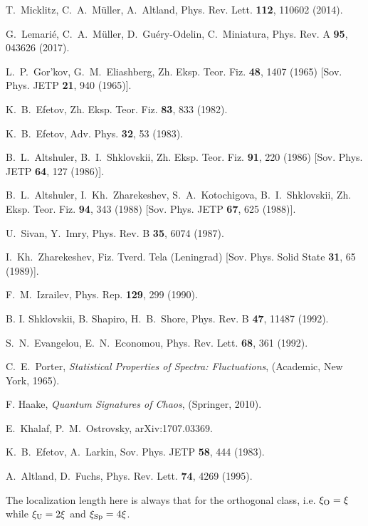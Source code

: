 \documentclass[twocolumn,showpacs,aps,prl]{revtex4}
\begin{document}
\begin{thebibliography}{99}
T.~Micklitz, C.~A.~M\"uller, A.~Altland,
 Phys. Rev. Lett. {\bf 112}, 110602 (2014).

G.~Lemari\'e, C.~A.~M\"uller, D.~Gu\'ery-Odelin, C.~Miniatura,
Phys. Rev. A {\bf 95}, 043626 (2017).

L.~P.~Gor'kov, G.~M.~Eliashberg, Zh. Eksp. Teor. Fiz. {\bf 48}, 1407 (1965) [Sov. Phys. JETP {\bf 21}, 940 (1965)].

K.~B.~Efetov, Zh. Eksp. Teor. Fiz. {\bf 83}, 833 (1982).

K.~B.~Efetov, Adv. Phys. {\bf 32}, 53 (1983).

B.~L.~Altshuler, B.~I.~Shklovskii, Zh. Eksp. Teor. Fiz. {\bf 91}, 220 (1986) [Sov. Phys. JETP {\bf 64}, 127 (1986)].

B.~L.~Altshuler, I.~Kh.~Zharekeshev, S.~A.~Kotochigova, B.~I.~Shklovskii, Zh. Eksp. Teor. Fiz. {\bf 94}, 343 (1988) [Sov. Phys. JETP {\bf 67}, 625 (1988)]. 

U.~Sivan, Y.~Imry, Phys. Rev. B {\bf 35}, 6074 (1987).

I.~Kh.~Zharekeshev, Fiz. Tverd. Tela (Leningrad) [Sov. Phys. Solid State {\bf 31}, 65 (1989)].

F.~M.~Izrailev, Phys. Rep. {\bf 129}, 299 (1990).

B. I. Shklovskii, B. Shapiro, H.~B.~Shore, Phys. Rev. B {\bf 47}, 11487 (1992).

S.~N.~Evangelou, E.~N.~Economou, Phys. Rev. Lett. {\bf 68}, 361 (1992).

C.~E.~Porter, {\it Statistical Properties of Spectra: Fluctuations}, (Academic, New York, 1965).

F. Haake, {\it Quantum Signatures of Chaos}, (Springer, 2010).

E.~Khalaf, P.~M.~Ostrovsky, arXiv:1707.03369.

K.~B.~Efetov, A.~Larkin, Sov. Phys. JETP {\bf 58}, 444 (1983).

A.~Altland, D.~Fuchs, Phys. Rev. Lett. {\bf 74}, 4269 (1995).

 The localization length  here is always that for the orthogonal class, i.e.
 $\xi_{\rm O}=\xi$ while $\xi_{\rm U}=2\xi$ and $\xi_{\rm Sp}=4\xi$.


\end{thebibliography}
\end{document}
